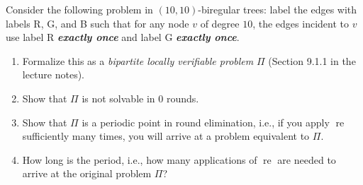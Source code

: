 \documentclass[12pt,a4paper]{article}
\newcommand{\hl}[1]{\textbf{\emph{#1}}}
\DeclareMathOperator{\re}{re}
\begin{document}
Consider the following problem in $(10,10)$-biregular trees: label the edges with labels R, G, and B such that for any node $v$ of degree $10$, the edges incident to $v$ use label R \hl{exactly once} and label G \hl{exactly once}.
\begin{enumerate}[label=(\alph*)]
\item Formalize this as a \emph{bipartite locally verifiable problem} $\Pi$ (Section 9.1.1 in the lecture notes).
\item Show that $\Pi$ is not solvable in $0$ rounds.
\item Show that $\Pi$ is a periodic point in round elimination, i.e., if you apply $\re$ sufficiently many times, you will arrive at a problem equivalent to $\Pi$.
\item How long is the period, i.e., how many applications of $\re$ are needed to arrive at the original problem $\Pi$?
\end{enumerate}
\end{document}
